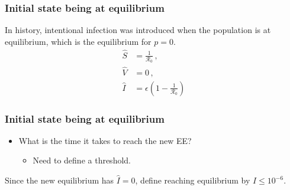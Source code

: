 \documentclass[12pt]{beamer}
\newcommand\dbyd[2]{\frac{\mathrm d{#1}}{\mathrm d{#2}}}
\newcommand{\R}{\mathcal{R}}
\newcommand{\pmV}{p_{V}}
\begin{document}
\begin{frame}
\frametitle{Initial state being at equilibrium}

In history, intentional infection was introduced when the population is at equilibrium, which is the equilibrium for $p=0$.
\pause
\begin{subequations}
\begin{align}
\hat{S} &= \frac{1}{\R_0} \,,\\
\hat{V} &= 0\,,\\
\hat{I} &= \epsilon(1-\frac{1}{\R_0})
\end{align}
\end{subequations}
\end{frame}
\begin{frame}
\frametitle{Initial state being at equilibrium}
\begin{itemize}
\item What is the time it takes to reach the new EE?
\begin{itemize}
\item Need to define a threshold.
\end{itemize}
\end{itemize}
\pause

Since the new equilibrium has $\hat{I}=0$, define reaching equilibrium by $I\leq 10^{-6}$.
\end{frame}
\end{document}
